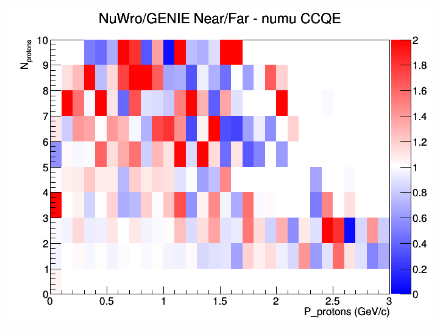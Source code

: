 \documentclass[12pt]{article}
\begin{document}
\begin{figure}[h]
\endminipage
{}
\includegraphics[width=\linewidth]{N_P/nominal/protons/ratios/CCQE_NuWro_GENIE_numu_NF_N_P.png}
\endminipage
\newline
\end{figure}
\clearpage
\end{document}
